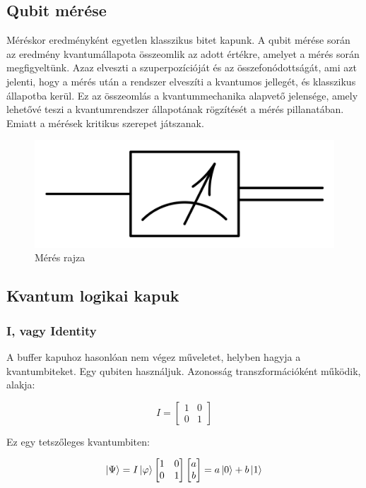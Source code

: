 \documentclass[
]{thesis-ekf}
\theoremstyle{definition}
\theoremstyle{remark}
\begin{document}
\subsection{Qubit mérése}
Méréskor eredményként egyetlen klasszikus bitet kapunk. A qubit mérése során az eredmény kvantumállapota összeomlik az adott értékre, amelyet a mérés során megfigyeltünk. Azaz elveszti a szuperpozícióját és az összefonódottságát, ami azt jelenti, hogy a mérés után a rendszer elveszíti a kvantumos jellegét, és klasszikus állapotba kerül. Ez az összeomlás a kvantummechanika alapvető jelensége, amely lehetővé teszi a kvantumrendszer állapotának rögzítését a mérés pillanatában. Emiatt a mérések kritikus szerepet játszanak.\cite{Chris Bernhardt}

\begin{figure}[H]
	\centering
	\includegraphics[width=0.3\linewidth]{measure}
	\caption{Mérés rajza}
	\label{fig:measure}
\end{figure}

\subsection{Kvantum logikai kapuk}\label{kvantumkapuk}

\subsubsection{I, vagy Identity}
A buffer kapuhoz hasonlóan nem végez műveletet, helyben hagyja a kvantumbiteket. Egy qubiten használjuk. Azonosság transzformációként működik, alakja:

\begin{equation}
	I= 
	\begin{bmatrix}
		1 & 0\\
		0 & 1
	\end{bmatrix}
\end{equation}

Ez egy tetszőleges kvantumbiten:

\begin{equation}
	\ket{\Psi}=I\ket{\varphi}
		\begin{bmatrix}
			1 & 0\\
			0 & 1
		\end{bmatrix}
		\begin{bmatrix}
			a\\
			b
		\end{bmatrix}=a\ket{0}+b\ket{1}
\end{equation}
\end{document}

